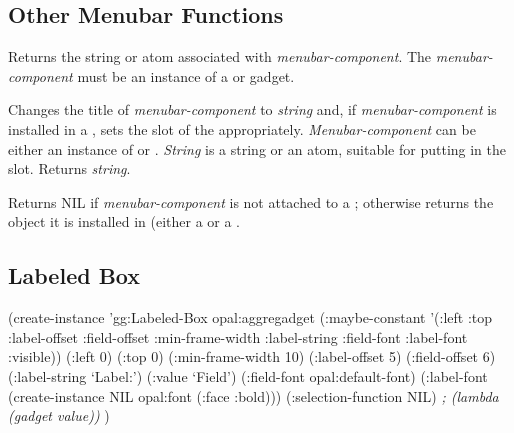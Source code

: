 \subsection{Other Menubar Functions}

Returns the string or atom associated with {\it menubar-component}.
The {\it menubar-component} must be an instance of a  or
 gadget.


Changes the title of {\it menubar-component} to {\it string} and, if
{\it menubar-component} is
installed in a , sets the  slot of the 
appropriately.  {\it Menubar-component} can be either an instance of
 or .  {\it String} is a string or an
atom, suitable for putting in the  slot.  Returns {\it string}.

Returns NIL if {\it menubar-component} is not attached to a ;
otherwise returns the object it is installed in (either a  or
a .



\begin{group}
\section{Labeled Box}
\label{labeled-box}
\begin{center}
\end{center}
\end{group}

\begin{programexample}
\begin{group}
(create-instance 'gg:Labeled-Box opal:aggregadget
   (:maybe-constant '(:left :top :label-offset :field-offset :min-frame-width
                      :label-string :field-font :label-font :visible))
   (:left 0)
   (:top 0)
   (:min-frame-width 10)
   (:label-offset 5)
   (:field-offset 6)
   (:label-string `Label:')
   (:value `Field')
   (:field-font opal:default-font)
   (:label-font (create-instance NIL opal:font (:face :bold)))
   (:selection-function NIL)   {\it ; (lambda (gadget value))}
   )
\end{group}
\end{programexample}


